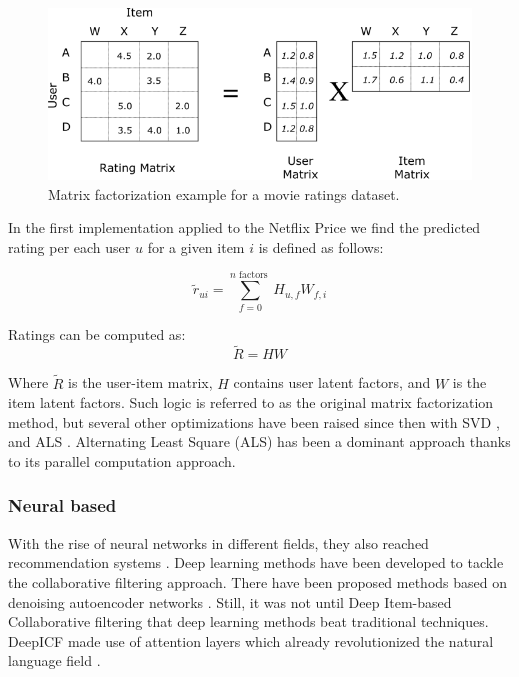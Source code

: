 \documentclass{kththesis}
\begin{document}
\begin{figure}[H]
    \centering
    \includegraphics[width=\textwidth]{images/background/matrix_factorization.png}
    \caption{Matrix factorization example for a movie ratings dataset.}
\end{figure}

In the first implementation applied to the Netflix Price \cite{matrixvanilla} we find the predicted rating per each user $u$ for a given item $i$ is defined as follows:

\begin{equation}
    \tilde{r}_{u i}=\sum_{f=0}^{n \text { factors }} H_{u, f} W_{f, i}
\end{equation}

Ratings can be computed as:
\begin{equation}
    \tilde{R}=H W
\end{equation}

Where $\tilde{R}$ is the user-item matrix, $H$ contains user latent factors, and $W$ is the item latent factors. Such logic is referred to as the original matrix factorization method, but several other optimizations have been raised since then with SVD \cite{svd}, and ALS \cite{alsnetflix}. Alternating Least Square (ALS) has been a dominant approach thanks to its parallel computation approach.


\subsubsection{Neural based}
With the rise of neural networks in different fields, they also reached recommendation systems \cite{neuralonrecommendations}. Deep learning methods have been developed to tackle the collaborative filtering approach. There have been proposed methods based on denoising autoencoder networks \cite{wang2015collaborative}. Still, it was not until Deep Item-based Collaborative filtering \cite{deepicf} that deep learning methods beat traditional techniques. DeepICF made use of attention layers which already revolutionized the natural language field \cite{attention}. 
\end{document}
